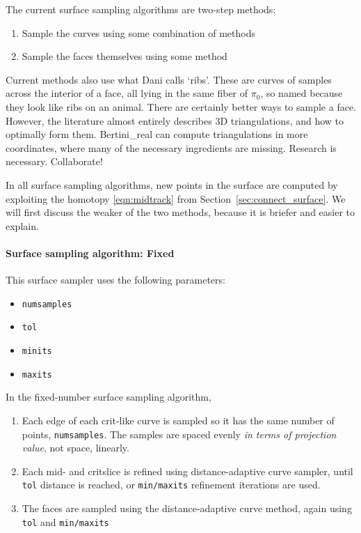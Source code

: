 The current surface sampling algorithms are two-step methods:
\begin{enumerate}
\item Sample the curves using some combination of methods
\item Sample the faces themselves using some method
\end{enumerate}



Current methods also use what Dani calls `ribs'.  These are curves of samples across the interior of a face, all lying in the same fiber of $\pi_0$, so named because they look like ribs on an animal.  There are certainly better ways to sample a face.  However, the literature almost entirely describes 3D triangulations, and how to optimally form them.  Bertini\_real can compute triangulations in more coordinates, where many of the necessary ingredients are missing.  Research is necessary.  Collaborate!

In all surface sampling algorithms, new points in the surface are computed by exploiting the homotopy \eqref{eqn:midtrack} from Section~\ref{sec:connect_surface}.  We will first discuss the weaker of the two methods, because it is briefer and easier to explain.












\paragraph{Surface sampling algorithm: Fixed}

This surface sampler uses the following parameters:
\begin{itemize}[noitemsep]
\item {\tt numsamples}
\item {\tt tol}
\item {\tt minits}
  \item {\tt maxits}
\end{itemize}

In the fixed-number surface sampling algorithm, 
\begin{enumerate}
\item Each edge of each crit-like curve is sampled so it has the same number of points, {\tt numsamples}.  The samples are spaced evenly {\em in terms of projection value}, not space, linearly.  

\item Each mid- and critslice is refined using distance-adaptive curve sampler, until {\tt tol} distance is reached, or {\tt min/maxits} refinement iterations are used.

\item The faces are sampled using the distance-adaptive curve method, again using {\tt tol} and {\tt min/maxits}
\end{enumerate}

